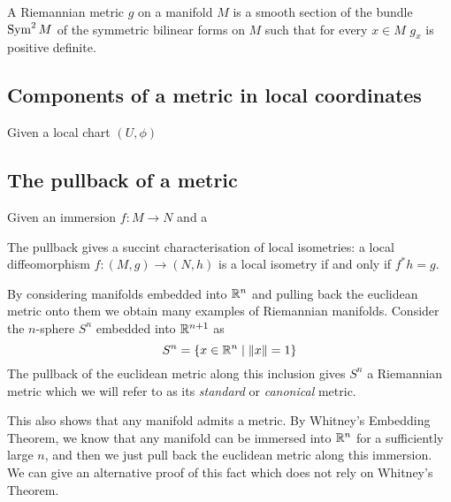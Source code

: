 \documentclass[12pt,twoside]{book}
\begin{document}
\begin{definition}
	A Riemannian metric \( g \) on a manifold \( M \) is a smooth section of the bundle \(
	\operatorname{Sym}^2 M \) of the symmetric bilinear forms on \( M \) such that for every \( x \in M \)
	\( g_x \) is positive definite. 
\end{definition}

\subsection{Components of a metric in local coordinates}
Given a local chart \( (U, \phi) \)

\subsection{The pullback of a metric}
Given an immersion \( f \colon M \to N \) and a 

The pullback gives a succint characterisation of local isometries: a local diffeomorphism
\( f \colon (M,g) \to (N,h) \) is a local isometry if and only if \( f^\ast h = g \). 

\begin{example}
	By considering manifolds embedded into \( \mathbb{R}^n \) and pulling back the euclidean metric
	onto them we obtain many examples of Riemannian manifolds. 
	Consider the \( n \)-sphere \( S^n \) embedded into \( \mathbb{R}^{n+1} \) as 
	\begin{equation*}
		S^n = \{ x \in \mathbb{R}^n \mid \left\lVert x \right\rVert = 1 \}
	\end{equation*}
	The pullback of the euclidean metric along this inclusion gives \( S^n \) a Riemannian
	metric which we will refer to as its \emph{standard} or \emph{canonical} metric. 
\end{example}

This also shows that any manifold admits a metric. By Whitney's Embedding Theorem, we know
that any manifold can be immersed into \( \mathbb{R}^n \) for a sufficiently large \( n \), and
then we just pull back the euclidean metric along this immersion. We can give an
alternative proof of this fact which does not rely on Whitney's Theorem. 
\end{document}
